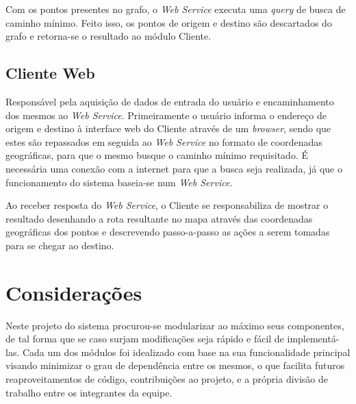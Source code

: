 Com os pontos presentes no grafo, o \emph{Web Service} executa uma \emph{query} de busca de caminho mínimo. Feito isso, os pontos de origem e destino são descartados do grafo e retorna-se o resultado ao módulo Cliente.
 
\subsection{Cliente Web}
Responsável pela aquisição de dados de entrada do usuário e encaminhamento dos mesmos ao \emph{Web Service}.
Primeiramente o usuário informa o endereço de origem e destino à interface web do Cliente através de um \emph{browser}, sendo que estes são repassados em seguida ao \emph{Web Service} no formato de coordenadas geográficas, para que o mesmo busque o caminho mínimo requisitado.
É necessária uma conexão com a internet para que a busca seja realizada, já que o funcionamento do sistema baseia-se num \emph{Web Service}.
 
Ao receber resposta do \emph{Web Service}, o Cliente se responsabiliza de mostrar o resultado desenhando a rota resultante no mapa através das coordenadas geográficas dos pontos e descrevendo passo-a-passo as ações a serem tomadas para se chegar ao destino.
 
\section{Considerações}
Neste projeto do sistema procurou-se modularizar ao máximo seus componentes, de tal forma que se caso surjam modificações seja rápido e fácil de implementá-las.
Cada um dos módulos foi idealizado com base na sua funcionalidade principal visando minimizar o grau de dependência entre os mesmos, o que facilita futuros reaproveitamentos de código, contribuições ao projeto, e a própria divisão de trabalho entre os integrantes da equipe.

